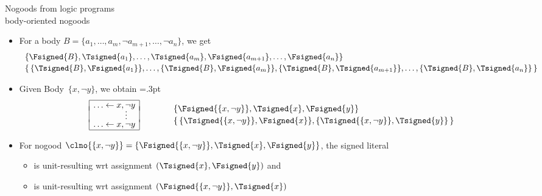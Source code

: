 \begin{frame}{Nogoods from logic programs\\[-1ex]\normalsize body-oriented nogoods}
  \begin{itemize}
  \item <1> For a body $B=\{a_1,\dots,a_m,\neg a_{m+1},\dots,\neg a_n\}$, %
    we get
    \vspace{-2pt}
    \[
    \begin{array}{l}
      \{\Fsigned{B},\Tsigned{a_1},\dots,\Tsigned{a_m},\Fsigned{a_{m+1}},\dots,\Fsigned{a_n}\}
      \\[2pt]
      \{\,
      \{\Tsigned{B},\Fsigned{a_1}\},
      \dots,
      \{\Tsigned{B},\Fsigned{a_m}\},
      \{\Tsigned{B},\Tsigned{a_{m+1}}\},
      \dots,
      \{\Tsigned{B},\Tsigned{a_n}\}
      \,\}
    \end{array}
  \]
  \item<2-> 
    Given Body~$\{x,\neg y\}$, we obtain
    \arrayrulewidth=.3pt
    \[
    \begin{array}{@{}|r@{}l|}
      \hline
      \ldots\leftarrow{}&x,\neg y\\[-1.2ex]
      &\quad\vdots\\[-3pt]
      \ldots\leftarrow{}&x,\neg y\\
      \hline
    \end{array}
    \quad\quad
    \begin{array}{p{5pt}l}
      &\{\Fsigned{\{x,\neg y\}},\Tsigned{x},\Fsigned{y}\}
      \\[2pt]
      &\{\,\{\Tsigned{\{x,\neg y\}},\Fsigned{x}\},\{\Tsigned{\{x,\neg y\}},\Tsigned{y}\}\,\}
    \end{array}
    \]
  \item<3-> []
    For nogood $\clno{\{x,\neg y\}}=\{\Fsigned{\{x,\neg y\}},\Tsigned{x},\Fsigned{y}\}$,
    the signed literal
    \begin{itemize}
    \item {} is unit-resulting  wrt assignment $(\Tsigned{x},\Fsigned{y})$
      and
    \item {}                    is unit-resulting  wrt assignment $(\Fsigned{\{x,\neg y\}},\Tsigned{x})$
    \end{itemize}
  \end{itemize}
\end{frame}
